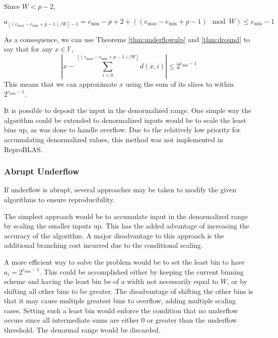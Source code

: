 \documentclass[12pt]{article}
\providecommand{\floor}[1]{\left \lfloor #1 \right \rfloor }
\providecommand{\F}{\ensuremath{\mathbb{F}}}
\providecommand{\min}{\ensuremath{\text{min}}}
\providecommand{\max}{\ensuremath{\text{max}}}
\theoremstyle{definition}
\numberwithin{equation}{section}
\begin{document}
      Since $W < p - 2$,

      \begin{equation*}
        a_{\floor{(e_{\max} - e_{\min} + p - 1)/W} - 1} = e_{\min} - p + 2 + ((e_{\max} - e_{\min} + p - 1 ) \mod W) \leq {e_{\min} - 1}
      \end{equation*}

      As a consequence, we can use Theorems \ref{thm:underflowulp} and \ref{thm:dround} to say that for any $x \in \F$,
      \begin{equation}
        |x - \sum\limits_{i = 0}^{\floor{(e_{\max} - e_{\min} + p - 1)/W}} d(x, i)| \leq 2^{e_{\min} - 1}
        \label{eq:droundunderflow}
      \end{equation}
      This means that we can approximate $x$ using the sum of its slices to within $2^{e_{\min} - 1}$.

      It is possible to deposit the input in the denormalized range. One simple way the algorithm could be extended to denormalized inputs would be to scale the least bins up, as was done to handle overflow. Due to the relatively low priority for accumulating denormalized values, this method was not implemented in ReproBLAS.

    \subsubsection{Abrupt Underflow}
      \label{sec:indexed_implementation_underflow_abrupt}
      If underflow is abrupt, several approaches may be taken to modify the given algorithms to ensure reproducibility.

      The simplest approach would be to accumulate input in the denormalized range by scaling the smaller inputs up. This has the added advantage of increasing the accuracy of the algorithm. A major disadvantage to this approach is the additional branching cost incurred due to the conditional scaling.

      A more efficient way to solve the problem would be to set the least bin to have $a_i = 2^{e_{\min} - 1}$. This could be accomplished either by keeping the current binning scheme and having the least bin be of a width not necessarily equal to $W$, or by shifting all other bins to be greater. The disadvantage of shifting the other bins is that it may cause multiple greatest bins to overflow, adding multiple scaling cases. Setting such a least bin would enforce the condition that no underflow occurs since all intermediate sums are either $0$ or greater than the underflow threshold. The denormal range would be discarded.
\end{document}

